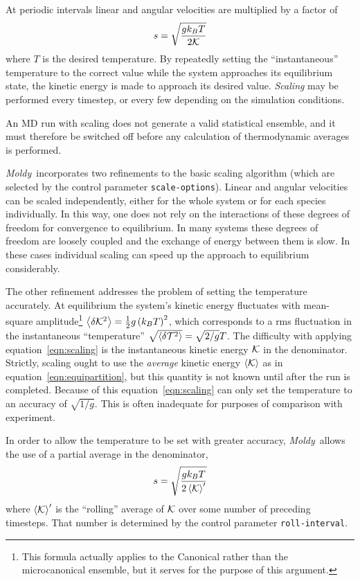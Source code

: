 \documentclass[twoside]{report}
\newcommand{\moldy}{{\em Moldy}}
\begin{document}
At periodic intervals linear and
angular velocities are multiplied by a factor of
\begin{equation}
\label{eqn:scaling}
s = \sqrt{\frac{gk_BT}{2\cal K}}
\end{equation}
where $T$ is the desired temperature.  By repeatedly setting the
``instantaneous'' temperature to the correct value while the system
approaches its equilibrium state, the kinetic energy is made to
approach its desired value.  {\em Scaling\/} may be performed every
timestep, or every few depending on the simulation conditions.

An MD run with scaling does not generate a valid statistical ensemble,
and it must therefore be switched off before any calculation of
thermodynamic averages is performed.

\moldy\ incorporates two refinements to the basic scaling algorithm
(which are selected by the control parameter \texttt{scale-options}).
Linear and angular velocities can be scaled independently, either for
the whole system or for each species individually.  In this way, one
does not rely on the interactions of these degrees of freedom for
convergence to equilibrium.  In many systems these degrees of freedom
are loosely coupled and the exchange of energy between them is slow.
In these cases individual scaling can speed up the approach to
equilibrium considerably.

The other refinement addresses the problem of setting the temperature
accurately.  At equilibrium the system's kinetic energy fluctuates
with mean-square amplitude\footnote{This formula actually applies to
the Canonical rather than the microcanonical ensemble, but it serves
for the purpose of this argument.} $\left < \delta {\cal K}^2\right > =
\frac{1}{2}g\left(k_BT\right)^2$, which corresponds to a
rms fluctuation in the instantaneous ``temperature'' 
$\sqrt{\left < \delta {\cal T}^2\right >} = 
\sqrt{2 /g} T$.   
The difficulty with applying equation~\ref{eqn:scaling}
is the instantaneous kinetic energy $\cal K$ in the denominator.
Strictly, scaling ought to use the {\em average\/} kinetic energy
$\left<\cal K \right>$ as in equation~\ref{eqn:equipartition}, but
this quantity is not known until after the run is completed.  Because
of this equation~\ref{eqn:scaling} can only set the temperature to an
accuracy of $\sqrt{1/g}$.  This is often inadequate for purposes of
comparison with experiment.

In order to allow the temperature to be set with greater accuracy,
\moldy\ allows the use of a partial average in the denominator,
\begin{equation}
\label{eqn:rav-scaling}
s = \sqrt{\frac{gk_BT}{2\left < {\cal  K}\right >^\prime}}
\end{equation}
where $\left < {\cal K}\right >^\prime$ is the ``rolling'' average of
$\cal K$ over some number of preceding timesteps.  That number is
determined by the control parameter \texttt{roll-interval}.   
\end{document}
